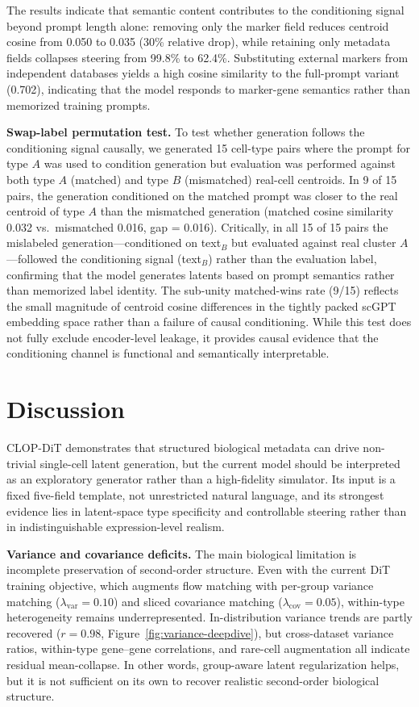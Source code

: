 \documentclass[genes,article,submit,pdftex,oneauthor]{Definitions/mdpi}
\begin{document}
The results indicate that semantic content contributes to the conditioning signal beyond prompt length alone: removing only the marker field reduces centroid cosine from 0.050 to 0.035 (30\% relative drop), while retaining only metadata fields collapses steering from 99.8\% to 62.4\%. Substituting external markers from independent databases yields a high cosine similarity to the full-prompt variant (0.702), indicating that the model responds to marker-gene semantics rather than memorized training prompts.

\textbf{Swap-label permutation test.} To test whether generation follows the conditioning signal causally, we generated 15 cell-type pairs where the prompt for type $A$ was used to condition generation but evaluation was performed against both type $A$ (matched) and type $B$ (mismatched) real-cell centroids. In 9 of 15 pairs, the generation conditioned on the matched prompt was closer to the real centroid of type $A$ than the mismatched generation (matched cosine similarity 0.032 vs.\ mismatched 0.016, gap = 0.016). Critically, in all 15 of 15 pairs the mislabeled generation---conditioned on text$_B$ but evaluated against real cluster $A$---followed the conditioning signal (text$_B$) rather than the evaluation label, confirming that the model generates latents based on prompt semantics rather than memorized label identity. The sub-unity matched-wins rate (9/15) reflects the small magnitude of centroid cosine differences in the tightly packed scGPT embedding space rather than a failure of causal conditioning. While this test does not fully exclude encoder-level leakage, it provides causal evidence that the conditioning channel is functional and semantically interpretable.

\section{Discussion}\label{sec:discussion}

CLOP-DiT demonstrates that structured biological metadata can drive non-trivial single-cell latent generation, but the current model should be interpreted as an exploratory generator rather than a high-fidelity simulator. Its input is a fixed five-field template, not unrestricted natural language, and its strongest evidence lies in latent-space type specificity and controllable steering rather than in indistinguishable expression-level realism.

\textbf{Variance and covariance deficits.} The main biological limitation is incomplete preservation of second-order structure. Even with the current DiT training objective, which augments flow matching with per-group variance matching ($\lambda_\text{var}=0.10$) and sliced covariance matching ($\lambda_\text{cov}=0.05$), within-type heterogeneity remains underrepresented. In-distribution variance trends are partly recovered ($r = 0.98$, Figure~\ref{fig:variance-deepdive}), but cross-dataset variance ratios, within-type gene--gene correlations, and rare-cell augmentation all indicate residual mean-collapse. In other words, group-aware latent regularization helps, but it is not sufficient on its own to recover realistic second-order biological structure.
\end{document}
